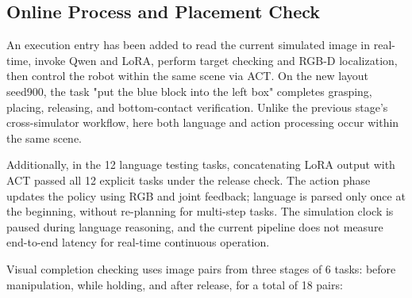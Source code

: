 \subsection{Online Process and Placement Check}\label{s05-detail-6}

An execution entry has been added to read the current simulated image in real-time, invoke Qwen and LoRA, perform target checking and RGB-D localization, then control the robot within the same scene via ACT. On the new layout seed900, the task "put the blue block into the left box" completes grasping, placing, releasing, and bottom-contact verification. Unlike the previous stage's cross-simulator workflow, here both language and action processing occur within the same scene.

Additionally, in the 12 language testing tasks, concatenating LoRA output with ACT passed all 12 explicit tasks under the release check. The action phase updates the policy using RGB and joint feedback; language is parsed only once at the beginning, without re-planning for multi-step tasks. The simulation clock is paused during language reasoning, and the current pipeline does not measure end-to-end latency for real-time continuous operation.

Visual completion checking uses image pairs from three stages of 6 tasks: before manipulation, while holding, and after release, for a total of 18 pairs:

